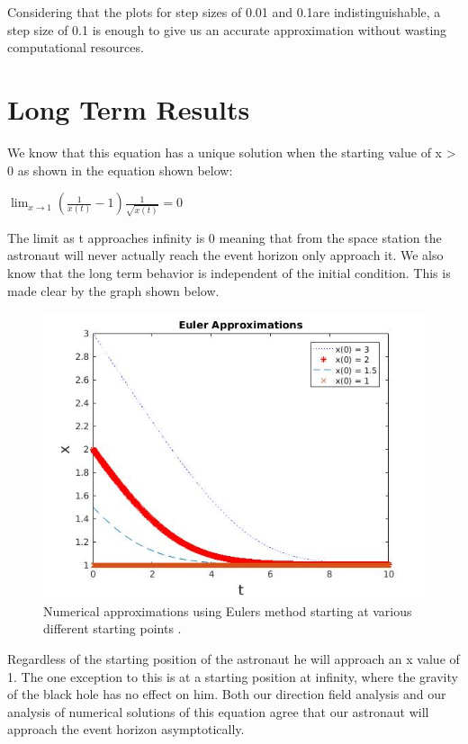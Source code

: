 \documentclass[11pt,english]{article}
\begin{document}
Considering that the plots for step sizes of 0.01 and 0.1are indistinguishable, a step size of 0.1 is enough to give us an accurate approximation without wasting computational resources.

\section*{Long Term Results}

We know that this equation has a unique solution when the starting value of x > 0 as shown in the equation shown below:

\begin{center}
  $\lim_{x\to1} (\frac{1}{x(t)} - 1) \frac{1}{\sqrt{x(t)}} = 0$ 
\end{center}

The limit as t approaches infinity is 0 meaning that from the space station the astronaut will never actually reach the event horizon only approach it. We also know that the long term behavior is independent of the initial condition. This is made clear by the graph shown below.

\begin{figure}[H]
  \includegraphics[width=\linewidth]{InitialValuePlots.jpg}
  \caption{Numerical approximations using Euler\textquotesingle s method starting at various different starting points .}
  \label{fig:euler2}
\end{figure}

Regardless of the starting position of the astronaut he will approach an x value of 1. The one exception to this is at a starting position at infinity, where the gravity of the black hole has no effect on him. Both our direction field analysis and our analysis of numerical solutions of this equation agree that our astronaut will approach the event horizon asymptotically.
\end{document}
